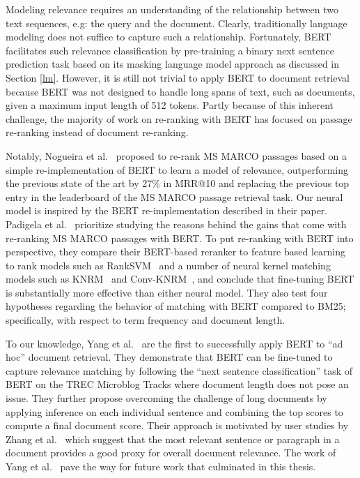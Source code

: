 Modeling relevance requires an understanding of the relationship between two text sequences, e.g: the query and the document.
Clearly, traditionally language modeling does not suffice to capture such a relationship.
Fortunately, BERT facilitates such relevance classification by pre-training a binary next sentence prediction task based on its masking language model approach as discussed in Section \ref{lm}.
However, it is still not trivial to apply BERT to document retrieval because BERT was not designed to handle long spans of text, such as documents, given a maximum input length of 512 tokens.
Partly because of this inherent challenge, the majority of work on re-ranking with BERT has focused on 
passage re-ranking instead of document re-ranking.

Notably, Nogueira et al.~\cite{nogueira2019passage} proposed to re-rank MS MARCO passages based on a simple re-implementation of BERT to learn a model of relevance, outperforming the previous state of the art by 27\% in MRR@10 and replacing the previous top entry in the leaderboard of the MS MARCO passage retrieval task.
Our neural model is inspired by the BERT re-implementation described in their paper.
Padigela et al.~\cite{Padigela:1905.01758:2019} prioritize studying the reasons behind the gains that come with re-ranking MS MARCO passages with BERT.
To put re-ranking with BERT into perspective, they compare their BERT-based reranker to feature based learning to rank models such as RankSVM~\cite{joachims2002optimizing} and a number of neural kernel matching models such as KNRM~\cite{xiong2017knrm} and Conv-KNRM~\cite{dai2018convolutional}, and conclude that  fine-tuning BERT is substantially more effective than either neural model.
They also test four hypotheses regarding the behavior of matching with BERT compared to BM25; specifically, with respect to term frequency and document length.

To our knowledge, Yang et al.~\cite{yang2019simple} are the first to successfully apply BERT to ``ad hoc'' document retrieval.
They demonstrate that BERT can be fine-tuned to capture relevance matching by following the ``next sentence classification'' task of BERT on the TREC Microblog Tracks where document length does not pose an issue.
They further propose overcoming the challenge of long documents by applying inference on each individual sentence and combining the top scores to compute a final document score.
Their approach is motivated by user studies by Zhang et al.~\cite{zhang2018effective} which suggest that the most relevant sentence or paragraph in a document provides a good proxy for overall document relevance.
The work of Yang et al.~\cite{yang2019simple} pave the way for future work that culminated in this thesis.

